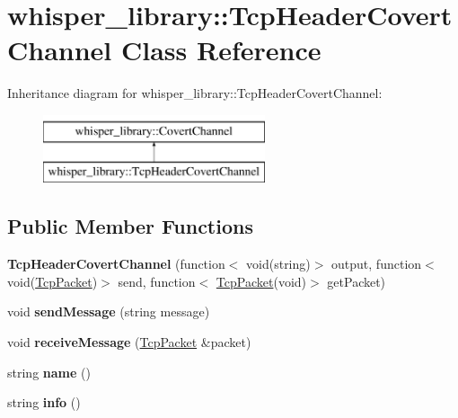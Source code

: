 \hypertarget{classwhisper__library_1_1TcpHeaderCovertChannel}{\section{whisper\-\_\-library\-:\-:\-Tcp\-Header\-Covert\-Channel \-Class \-Reference}
\label{classwhisper__library_1_1TcpHeaderCovertChannel}
}
\-Inheritance diagram for whisper\-\_\-library\-:\-:\-Tcp\-Header\-Covert\-Channel\-:\begin{figure}[H]
\begin{center}
\leavevmode
\includegraphics[height=2.000000cm]{classwhisper__library_1_1TcpHeaderCovertChannel}
\end{center}
\end{figure}
\subsection*{\-Public \-Member \-Functions}
\begin{DoxyCompactItemize}
\item 
\hypertarget{classwhisper__library_1_1TcpHeaderCovertChannel_a521fde23e4d0fd626d8bae0e96624f0f}{{\bfseries \-Tcp\-Header\-Covert\-Channel} (function$<$ void(string)$>$ output, function$<$ void(\hyperlink{classwhisper__library_1_1TcpPacket}{\-Tcp\-Packet})$>$ send, function$<$ \hyperlink{classwhisper__library_1_1TcpPacket}{\-Tcp\-Packet}(void)$>$ get\-Packet)}\label{classwhisper__library_1_1TcpHeaderCovertChannel_a521fde23e4d0fd626d8bae0e96624f0f}

\item 
\hypertarget{classwhisper__library_1_1TcpHeaderCovertChannel_a6dff40ad2e449e667bf8531cada593ae}{void {\bfseries send\-Message} (string message)}\label{classwhisper__library_1_1TcpHeaderCovertChannel_a6dff40ad2e449e667bf8531cada593ae}

\item 
\hypertarget{classwhisper__library_1_1TcpHeaderCovertChannel_a079cf5fe50212670c0ae18a879de2ba6}{void {\bfseries receive\-Message} (\hyperlink{classwhisper__library_1_1TcpPacket}{\-Tcp\-Packet} \&packet)}\label{classwhisper__library_1_1TcpHeaderCovertChannel_a079cf5fe50212670c0ae18a879de2ba6}

\item 
\hypertarget{classwhisper__library_1_1TcpHeaderCovertChannel_adc2bdd885c9e766e053806dd7009919e}{string {\bfseries name} ()}\label{classwhisper__library_1_1TcpHeaderCovertChannel_adc2bdd885c9e766e053806dd7009919e}

\item 
\hypertarget{classwhisper__library_1_1TcpHeaderCovertChannel_a6856ab1ba7b94e9660b667243a9758fe}{string {\bfseries info} ()}\label{classwhisper__library_1_1TcpHeaderCovertChannel_a6856ab1ba7b94e9660b667243a9758fe}

\end{DoxyCompactItemize}


